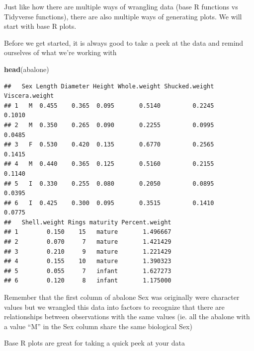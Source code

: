 \documentclass[
]{book}
\newenvironment{Shaded}{\begin{snugshade}}{\end{snugshade}}
\newcommand{\FunctionTok}[1]{\textcolor[rgb]{0.13,0.29,0.53}{\textbf{#1}}}
\newcommand{\NormalTok}[1]{#1}
\newcommand{\SpecialCharTok}[1]{\textcolor[rgb]{0.81,0.36,0.00}{\textbf{#1}}}
\begin{document}
Just like how there are multiple ways of wrangling data (base R functions vs Tidyverse functions), there are also multiple ways of generating plots. We will start with base R plots.

Before we get started, it is always good to take a peek at the data and remind ourselves of what we're working with

\begin{Shaded}
\begin{Highlighting}[]
\FunctionTok{head}\NormalTok{(abalone)}
\end{Highlighting}
\end{Shaded}

\begin{verbatim}
##   Sex Length Diameter Height Whole.weight Shucked.weight Viscera.weight
## 1   M  0.455    0.365  0.095       0.5140         0.2245         0.1010
## 2   M  0.350    0.265  0.090       0.2255         0.0995         0.0485
## 3   F  0.530    0.420  0.135       0.6770         0.2565         0.1415
## 4   M  0.440    0.365  0.125       0.5160         0.2155         0.1140
## 5   I  0.330    0.255  0.080       0.2050         0.0895         0.0395
## 6   I  0.425    0.300  0.095       0.3515         0.1410         0.0775
##   Shell.weight Rings maturity Percent.weight
## 1        0.150    15   mature       1.496667
## 2        0.070     7   mature       1.421429
## 3        0.210     9   mature       1.221429
## 4        0.155    10   mature       1.390323
## 5        0.055     7   infant       1.627273
## 6        0.120     8   infant       1.175000
\end{verbatim}

Remember that the first column of abalone Sex was originally were character values but we wrangled this data into factors to recognize that there are relationships between observations with the same values (ie. all the abalone with a value ``M'' in the Sex column share the same biological Sex)

Base R plots are great for taking a quick peek at your data

\begin{Shaded}
\end{Shaded}
\end{document}
